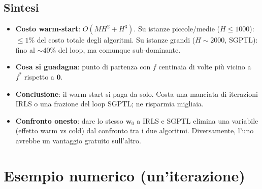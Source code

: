 \documentclass[11pt,a4paper]{article}
\newcommand{\bw}{\mathbf{w}}
\newcommand{\bzero}{\mathbf{0}}
\theoremstyle{definition}
\begin{document}
\subsection{Sintesi}

\begin{tcolorbox}[intuition]
\begin{itemize}[leftmargin=*]
\item \textbf{Costo warm-start}: $O(MH^2 + H^3)$. Su istanze piccole/medie ($H\le 1000$): $\le 1\%$ del costo totale degli algoritmi. Su istanze grandi ($H\sim 2000$, SGPTL): fino al $\sim 40\%$ del loop, ma comunque sub-dominante.
\item \textbf{Cosa si guadagna}: punto di partenza con $f$ centinaia di volte più vicino a $f^*$ rispetto a $\bzero$.
\item \textbf{Conclusione}: il warm-start si paga da solo. Costa una manciata di iterazioni IRLS o una frazione del loop SGPTL; ne risparmia migliaia.
\item \textbf{Confronto onesto}: dare lo stesso $\bw_0$ a IRLS e SGPTL elimina una variabile (effetto warm vs cold) dal confronto tra i due algoritmi. Diversamente, l'uno avrebbe un vantaggio gratuito sull'altro.
\end{itemize}
\end{tcolorbox}

\section{Esempio numerico (un'iterazione)}
\end{document}
